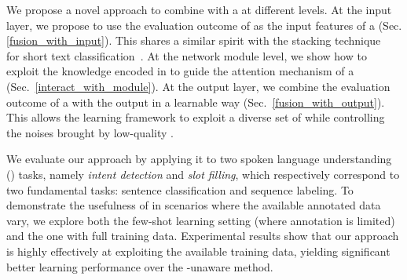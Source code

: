 


We propose a novel approach to combine \REs with a \NN at different levels. At the input layer, we propose to use the evaluation outcome of
\REs as the input features of a \NN (Sec.\ref{fusion_with_input}). This shares a similar spirit with the stacking
technique~\cite{wolpert1992stacked} for short text classification~\cite{wang2017combining}. At the network module level, we show how to
exploit the knowledge encoded in \REs to guide the attention mechanism of a \NN (Sec.~\ref{interact_with_module}). At the output layer, we
combine the evaluation outcome of a \RE with the \NN output in a learnable way (Sec.~\ref{fusion_with_output}). This allows the learning
framework to exploit a diverse set of \REs while controlling the noises brought by low-quality \REs.

%
We evaluate our approach by applying it to two spoken language understanding (\SLU) tasks, namely \emph{intent detection} and \emph{slot
filling}, which respectively correspond to two fundamental \NLP tasks: sentence classification and sequence labeling. To demonstrate the
usefulness of \REs in scenarios where the available annotated data vary, we explore both the few-shot learning setting (where annotation is
limited) and the one with full training data. Experimental results show that our approach is highly effectively at exploiting the available
training data, yielding significant better learning performance over the \RE-unaware method.


